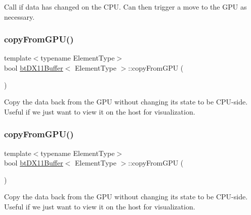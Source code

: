 Call if data has changed on the C\+PU. Can then trigger a move to the G\+PU as necessary. \mbox{\label{classbtDX11Buffer_a116aed0cd9715e4776e08ecccc68d01b}} 
\subsubsection{\texorpdfstring{copy\+From\+G\+P\+U()}{copyFromGPU()}\hspace{0.1cm}{\footnotesize\ttfamily [1/2]}}
{\footnotesize\ttfamily template$<$typename Element\+Type$>$ \\
bool \hyperlink{classbtDX11Buffer}{bt\+D\+X11\+Buffer}$<$ Element\+Type $>$\+::copy\+From\+G\+PU (\begin{DoxyParamCaption}{ }\end{DoxyParamCaption})\hspace{0.3cm}{\ttfamily [inline]}}

Copy the data back from the G\+PU without changing its state to be C\+P\+U-\/side. Useful if we just want to view it on the host for visualization. \mbox{\label{classbtDX11Buffer_a116aed0cd9715e4776e08ecccc68d01b}} 
\subsubsection{\texorpdfstring{copy\+From\+G\+P\+U()}{copyFromGPU()}\hspace{0.1cm}{\footnotesize\ttfamily [2/2]}}
{\footnotesize\ttfamily template$<$typename Element\+Type$>$ \\
bool \hyperlink{classbtDX11Buffer}{bt\+D\+X11\+Buffer}$<$ Element\+Type $>$\+::copy\+From\+G\+PU (\begin{DoxyParamCaption}{ }\end{DoxyParamCaption})\hspace{0.3cm}{\ttfamily [inline]}}

Copy the data back from the G\+PU without changing its state to be C\+P\+U-\/side. Useful if we just want to view it on the host for visualization. \mbox{\label{classbtDX11Buffer_aacac21503809131b8991c0cee42e0b1b}} 
